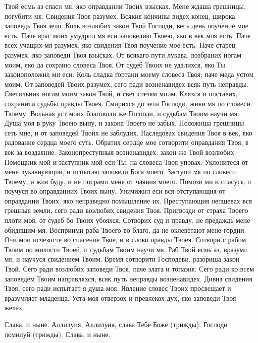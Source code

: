 Твой есмь аз спаси мя, яко оправдании Твоих взысках. Мене ждаша грешницы, погубити мя. Свидения Твоя разумех. Всякия кончины видех конец, широка заповедь Твоя зело. Коль возлюбих закон Твой Господи, весь день поучение мое есть. Паче враг моих умудрил мя еси заповедию Твоею, яко в век моя есть. Паче всех учащих мя разумех, яко свидения Твоя поучение мое есть. Паче старец разумех, яко заповеди Твоя взысках. От всякаго пути лукава, возбраних ногам моим, яко да сохраню словеса Твоя. От судеб Твоих не удалихся, яко Ты законоположил ми еси. Коль сладка гортани моему словеса Твоя; паче меда устом моим. От заповедей Твоих разумех, сего ради возненавидех всяк путь неправды. Светильник ногам моим закон Твой, и свет стезям моим. Кляхся и поставих, сохранити судьбы правды Твоея. Смирихся до зела Господи, живи мя по словеси Твоему. Вольная уст моих благоволи же Господи, и судьбам Твоим научи мя. Душа моя в руку Твоею выну, и закона Твоего не забых. Положиша грешницы сеть мне, и от заповедей Твоих не заблудих. Наследовах свидения Твоя в век, яко радование сердца моего суть. Обратих сердце мое сотворити оправдания Твоя, в век за воздаяние. Законопреступныя возненавидех, закон же Твой возлюбих. Помощник мой и заступник мой еси Ты, на словеса Твоя уповах. Уклонитеся от мене лукавнующии, и испытаю заповеди Бога моего. Заступи мя по словеси Твоему, и жив буду, и не посрами мене от чаяния моего. Помози ми и спасуся, и поучуся во оправданиих Твоих выну. Уничижил еси вся отступающия от оправдании Твоих, яко неправедно помышление их. Преступающия непщевах вся грешныя земли, сего ради возлюбих свидения Твоя. Пригвозди от страха Твоего плоти моя, от судеб бо Твоих убояхся. Сотворих суд и правду, не предаждь мене обидящим мя. Восприими раба Твоего во благо, да не оклеветают мене гордии. Очи мои исчезосте во спасение Твое, и в слово правды Твоея. Сотвори с рабом Твоим по милости Твоей, и судьбам Твоим научи мя. Раб Твой есмь аз, вразуми мя, и научуся свидением Твоим. Время сотворити Господеви, разориша закон Твой. Сего ради возлюбих заповеди Твоя, паче злата и топазия. Сего ради ко всем заповедем Твоим направляхся, всяк путь неправды возненавидех. Дивна свидения Твоя, сего ради испытает я душа моя. Явление словес Твоих просвещает и вразумляет младенца. Уста моя отверзох и превлекох дух, яко заповеди Твоя желах. 

Слава, и ныне. Аллилуия, Аллилуия, слава Тебе Боже (трижды). Господи помилуй (трижды). Слава, и ныне.


\medskip


